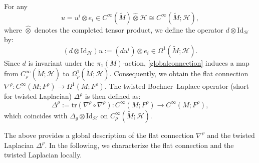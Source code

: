 \documentclass[11pt,oneside,reqno]{amsart}
\theoremstyle{definition}
\numberwithin{equation}{section}
\theoremstyle{plain}
\begin{document}

For any
\begin{equation*}
  u = u^i \otimes e_i \in C^{\infty}(\widetilde{M}) \widehat{\otimes} \mathcal{H} \cong  C^{\infty}(\widetilde{M}; \mathcal{H})   ,
\end{equation*}
where $\widehat{\otimes}$ denotes the completed tensor product, we define the operator $d \otimes \mathrm{Id}_{\mathcal{H}}$ by:
\begin{equation}\label{globalconnection}
    (d \otimes \mathrm{Id}_{\mathcal{H}})u := (du^i) \otimes e_i \in \Omega^1(\widetilde{M}; \mathcal{H}).
\end{equation}
Since $d$ is invariant under the $\pi_{1}(M)$-action, \eqref{globalconnection} induces a map from $C^{\infty}_{\rho}(\widetilde{M} ;\mathcal{H})$ to $\Omega^{1}_{\rho}(\widetilde{M}; \mathcal{H})$. Consequently, we obtain the flat connection $\nabla^{\rho}: C^{\infty}(M;F^{\rho}) \to \Omega^1(M;F^{\rho})$. The twisted Bochner–Laplace operator (short for twisted Laplacian) $\Delta^{\rho}$ is then defined as:
\begin{equation}
\Delta^\rho := \mathrm{tr}(\nabla^\rho\circ \nabla^\rho ): C^{\infty}(M;F^{\rho}) \to C^{\infty}(M;F^{\rho}),
\end{equation}
which coincides with $\Delta_g \otimes \mathrm{Id}_{\mathcal{H}}$ on $C_{\rho}^{\infty}(\widetilde{M}; \mathcal{H})$. 

The above provides a global description of the flat connection $\nabla^{\rho}$ and the twisted Laplacian $\Delta^{\rho}$. In the following, we characterize the flat connection and the twisted Laplacian locally. 
\end{document}

